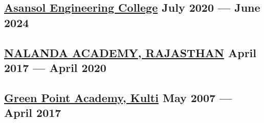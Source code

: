 





\subsection{{\href{https://www.aecwb.edu.in/}{Asansol Engineering College} \hfill July 2020 --- June 2024}}
\begin{null}

\end{null}

\subsection{{\href{https://www.nalandaacademy.ac.in/}{NALANDA ACADEMY, RAJASTHAN} \hfill April 2017 --- April 2020}}
\begin{null}

\end{null}

\subsection{{\href{https://www.greenpointacademy.org/}{Green Point Academy, Kulti} \hfill May 2007 --- April 2017}}
\begin{null}

\end{null}


